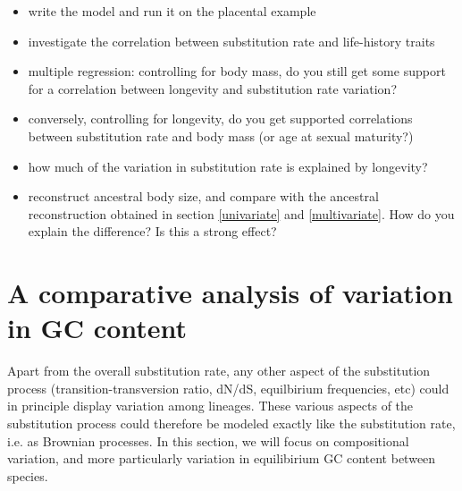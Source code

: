 \documentclass[usletter]{article}
\begin{document}
\begin{itemize}
\item
write the model and run it on the placental example
\item
investigate the correlation between substitution rate and life-history traits
\item
multiple regression: controlling for body mass, do you still get some support for a correlation between longevity and substitution rate variation?
\item
conversely, controlling for longevity, do you get supported correlations between substitution rate and body mass (or age at sexual maturity?)
\item
how much of the variation in substitution rate is explained by longevity?
\item
reconstruct ancestral body size, and compare with the ancestral reconstruction obtained in section \ref{univariate} and \ref{multivariate}. How do you explain the difference? Is this a strong effect?
\end{itemize}

\section{A comparative analysis of variation in GC content}

Apart from the overall substitution rate, any other aspect of the substitution process (transition-transversion ratio, dN/dS, equilbirium frequencies, etc) could in principle display variation among lineages. These various aspects of the substitution  process could therefore be modeled exactly like the substitution rate, i.e. as Brownian processes.
In this section, we will focus on compositional variation, and more particularly variation in equilibirium GC content between species.
\end{document}
